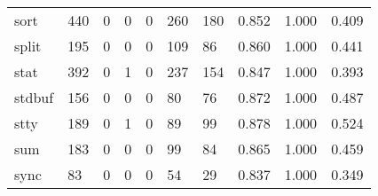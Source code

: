 \begin{longtable}{lp{2.0cm}p{2.0cm}p{2.0cm}p{2.0cm}p{2.0cm}p{2.0cm}p{2.0cm}p{2.0cm}p{2.0cm}}
sort      &                    440 &                                             0 &                                            0 &                                           0 &                                          260 &                                        180 &                                0.852 &                                  1.000 &                                0.409 \\
split     &                    195 &                                             0 &                                            0 &                                           0 &                                          109 &                                         86 &                                0.860 &                                  1.000 &                                0.441 \\
stat      &                    392 &                                             0 &                                            1 &                                           0 &                                          237 &                                        154 &                                0.847 &                                  1.000 &                                0.393 \\
stdbuf    &                    156 &                                             0 &                                            0 &                                           0 &                                           80 &                                         76 &                                0.872 &                                  1.000 &                                0.487 \\
stty      &                    189 &                                             0 &                                            1 &                                           0 &                                           89 &                                         99 &                                0.878 &                                  1.000 &                                0.524 \\
sum       &                    183 &                                             0 &                                            0 &                                           0 &                                           99 &                                         84 &                                0.865 &                                  1.000 &                                0.459 \\
sync      &                     83 &                                             0 &                                            0 &                                           0 &                                           54 &                                         29 &                                0.837 &                                  1.000 &                                0.349 \\

\end{longtable}
